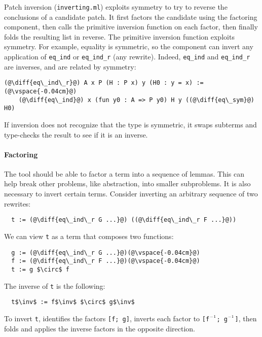 Patch inversion (\lstinline{inverting.ml}) exploits symmetry to try to reverse the conclusions of a 
candidate patch.
It first factors the candidate using the factoring component, then calls the primitive inversion
function on each factor, then finally folds the resulting list in reverse.
The primitive inversion function exploits symmetry. 
For example, equality is symmetric, so the component can invert any application of \lstinline{eq_ind} or \lstinline{eq_ind_r}
(any rewrite). Indeed, \lstinline{eq_ind} and \lstinline{eq_ind_r} are inverses, and are related by symmetry:

\begin{lstlisting}[language=coq]
  (@\diff{eq\_ind\_r}@) A x P (H : P x) y (H0 : y = x) :=(@\vspace{-0.04cm}@)
    (@\diff{eq\_ind}@) x (fun y0 : A => P y0) H y ((@\diff{eq\_sym}@) H0)	
\end{lstlisting}
If inversion does not recognize that the type is symmetric, it
swaps subterms and type-checks the result to see if it is an inverse.

\paragraph{Factoring} The tool should be able to factor a term into a sequence of lemmas.
This can help break other problems, like abstraction, into smaller subproblems.
It is also necessary to invert certain terms.
Consider inverting an arbitrary sequence of two rewrites:

\begin{lstlisting}
  t := (@\diff{eq\_ind\_r G ...}@) ((@\diff{eq\_ind\_r F ...}@))
\end{lstlisting}
We can view \lstinline{t} as a term that composes two functions:

\begin{lstlisting}
  g := (@\diff{eq\_ind\_r G ...}@)(@\vspace{-0.04cm}@)
  f := (@\diff{eq\_ind\_r F ...}@)(@\vspace{-0.04cm}@)
  t := g $\circ$ f
\end{lstlisting}
The inverse of \lstinline{t} is the following:

\begin{lstlisting}
  t$\inv$ := f$\inv$ $\circ$ g$\inv$
\end{lstlisting}
To invert \lstinline{t}, \sysname identifies the factors \lstinline{[f; g]}, 
inverts each factor to \lstinline{[f}$\inv$\lstinline{; g}$\inv$\lstinline{]}, 
then folds and applies the inverse factors in the opposite direction.

